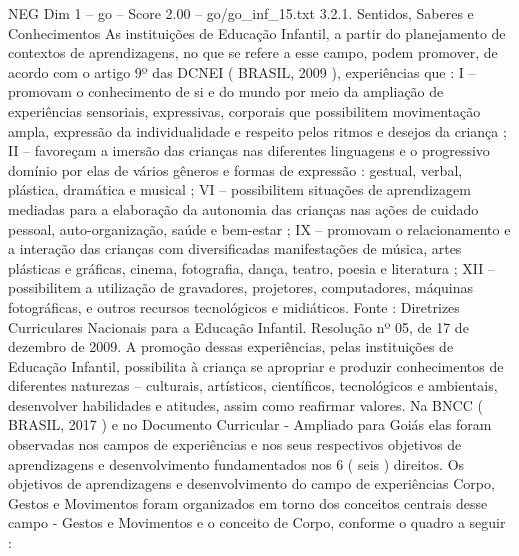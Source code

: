 \begin{textsample}{NEG Dim 1 – go – Score 2.00 – go/go\_inf\_15.txt}  \label{ex:f1_neg_194}
3.2.1.
Sentidos, Saberes e Conhecimentos As instituições de Educação Infantil, a partir do planejamento de contextos de aprendizagens, no que se refere a esse campo, podem promover, de acordo com o artigo 9º das DCNEI ( BRASIL, 2009 ), experiências que : I – promovam o conhecimento de si e do mundo por meio da ampliação de experiências sensoriais, expressivas, corporais que possibilitem movimentação ampla, expressão da individualidade e respeito pelos ritmos e desejos da criança ; II – favoreçam a imersão das crianças nas diferentes linguagens e o progressivo domínio por elas de vários gêneros e formas de expressão : gestual, verbal, plástica, dramática e musical ; VI – possibilitem situações de aprendizagem mediadas para a elaboração da autonomia das crianças nas ações de cuidado pessoal, auto-organização, saúde e bem-estar ; IX – promovam o relacionamento e a interação das crianças com diversificadas manifestações de música, artes plásticas e gráficas, cinema, fotografia, dança, teatro, poesia e literatura ; XII – possibilitem a utilização de gravadores, projetores, computadores, máquinas fotográficas, e outros recursos tecnológicos e midiáticos.
Fonte : Diretrizes Curriculares Nacionais para a Educação Infantil.
Resolução nº 05, de 17 de dezembro de 2009.
A promoção dessas experiências, pelas instituições de Educação Infantil, possibilita à criança se apropriar e produzir conhecimentos de diferentes naturezas – culturais, artísticos, científicos, tecnológicos e ambientais, desenvolver habilidades e atitudes, assim como reafirmar valores.
Na BNCC ( BRASIL, 2017 ) e no Documento Curricular - Ampliado para Goiás elas foram observadas nos campos de experiências e nos seus respectivos objetivos de aprendizagens e desenvolvimento fundamentados nos 6 ( seis ) direitos.
Os objetivos de aprendizagens e desenvolvimento do campo de experiências Corpo, Gestos e Movimentos foram organizados em torno dos conceitos centrais desse campo - Gestos e Movimentos e o conceito de Corpo, conforme o quadro a seguir :

\end{textsample}
